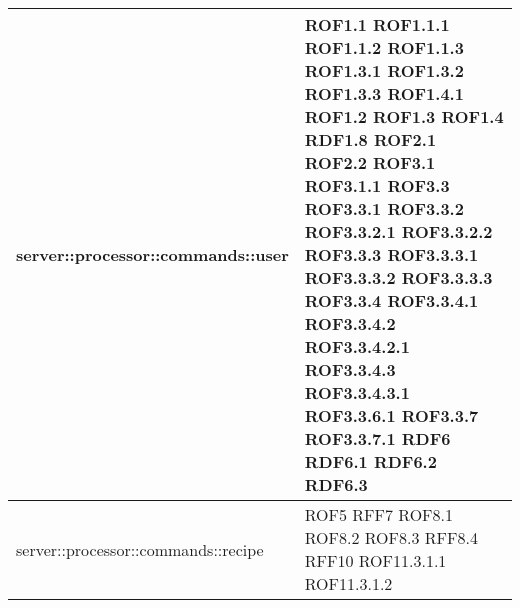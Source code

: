 \begin{center}
\begin{longtable}{| p{9cm} | p{4cm} |}
server::processor::commands::user  &  ROF1.1 \newline ROF1.1.1 \newline ROF1.1.2 \newline ROF1.1.3 \newline ROF1.3.1 \newline ROF1.3.2 \newline ROF1.3.3 \newline ROF1.4.1 \newline ROF1.2 \newline ROF1.3 \newline ROF1.4 \newline RDF1.8 \newline ROF2.1 \newline ROF2.2 \newline ROF3.1 \newline ROF3.1.1  \newline ROF3.3 \newline ROF3.3.1 \newline ROF3.3.2 \newline ROF3.3.2.1 \newline ROF3.3.2.2 \newline ROF3.3.3 \newline ROF3.3.3.1 \newline ROF3.3.3.2 \newline ROF3.3.3.3 \newline ROF3.3.4 \newline ROF3.3.4.1 \newline ROF3.3.4.2 \newline ROF3.3.4.2.1 \newline ROF3.3.4.3 \newline ROF3.3.4.3.1 \newline ROF3.3.6.1 \newline ROF3.3.7 \newline ROF3.3.7.1 \newline RDF6 \newline RDF6.1 \newline RDF6.2 \newline RDF6.3 \newline \\
\hline
server::processor::commands::recipe  & ROF5 \newline RFF7 \newline ROF8.1 \newline ROF8.2 \newline ROF8.3 \newline RFF8.4 \newline RFF10 \newline ROF11.3.1.1 \newline ROF11.3.1.2 \newline \\

\end{longtable}
\end{center}
